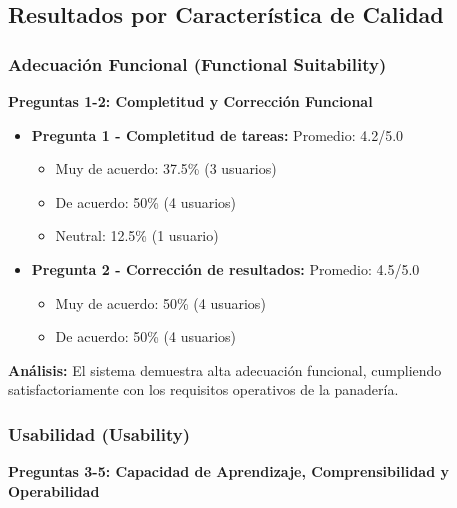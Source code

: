 \documentclass[conference]{IEEEtran}
\begin{document}
\subsection{Resultados por Característica de Calidad}

\subsubsection{Adecuación Funcional (Functional Suitability)}
\textbf{Preguntas 1-2: Completitud y Corrección Funcional}

\begin{itemize}
    \item \textbf{Pregunta 1 - Completitud de tareas:} Promedio: 4.2/5.0
        \begin{itemize}
            \item Muy de acuerdo: 37.5\% (3 usuarios)
            \item De acuerdo: 50\% (4 usuarios)
            \item Neutral: 12.5\% (1 usuario)
        \end{itemize}
    \item \textbf{Pregunta 2 - Corrección de resultados:} Promedio: 4.5/5.0
        \begin{itemize}
            \item Muy de acuerdo: 50\% (4 usuarios)
            \item De acuerdo: 50\% (4 usuarios)
        \end{itemize}
\end{itemize}

\textbf{Análisis:} El sistema demuestra alta adecuación funcional, cumpliendo satisfactoriamente con los requisitos operativos de la panadería.

\subsubsection{Usabilidad (Usability)}
\textbf{Preguntas 3-5: Capacidad de Aprendizaje, Comprensibilidad y Operabilidad}
\end{document}
